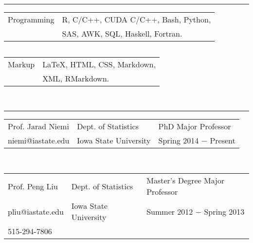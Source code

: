 \documentclass{article}
\newcommand{\q}{$\quad$ \newline}
\newcommand{\vl}{4.25}
\newcommand{\wl}{8.4}
\newcommand{\ww}{13}
\newcommand{\myrule}{\noindent \rule{\textwidth}{1pt}}
\begin{document}

\myrule
 
\noindent \begin{tabular}{@{}p{\vl cm}p{\ww cm}@{}}
Programming & R, C/C++, CUDA C/C++, Bash, Python,  \\
 &SAS, AWK, SQL, Haskell, Fortran.  \\
\end{tabular} \q 

\noindent \begin{tabular}{@{}p{\vl cm}p{\ww cm}@{}}
Markup& LaTeX, HTML, CSS, Markdown,  \\
 & XML, RMarkdown.  \\
\end{tabular} \q \q



\myrule

\noindent \begin{tabular}{@{}p{\vl cm}p{\wl cm}l@{}}
Prof. Jarad Niemi & Dept. of Statistics & PhD Major Professor  \\
niemi@iastate.edu & Iowa State University & Spring 2014 $-$ Present \\
\end{tabular} \q \q

\noindent \begin{tabular}{@{}p{\vl cm}p{\wl cm}l@{}}
Prof. Peng Liu & Dept. of Statistics & Master's Degree Major Professor \\
pliu@iastate.edu & Iowa State University & Summer 2012 $-$ Spring 2013 \\
515-294-7806 & & 
\end{tabular} \q \q




\end{document}
